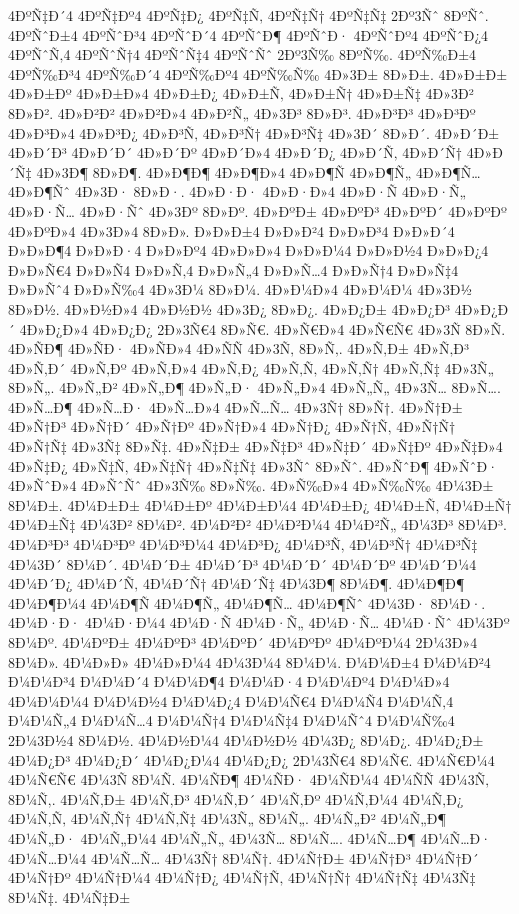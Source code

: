 {4ÐºÑ‡Ð´4
4ÐºÑ‡Ðº4
4ÐºÑ‡Ð¿
4ÐºÑ‡Ñ‚
4ÐºÑ‡Ñ†
4ÐºÑ‡Ñ‡
2Ðº3Ñˆ
8ÐºÑˆ.
4ÐºÑˆÐ±4
4ÐºÑˆÐ³4
4ÐºÑˆÐ´4
4ÐºÑˆÐ¶
4ÐºÑˆÐ·
4ÐºÑˆÐº4
4ÐºÑˆÐ¿4
4ÐºÑˆÑ‚4
4ÐºÑˆÑ†4
4ÐºÑˆÑ‡4
4ÐºÑˆÑˆ
2Ðº3Ñ‰
8ÐºÑ‰.
4ÐºÑ‰Ð±4
4ÐºÑ‰Ð³4
4ÐºÑ‰Ð´4
4ÐºÑ‰Ðº4
4ÐºÑ‰Ñ‰
4Ð»3Ð±
8Ð»Ð±.
4Ð»Ð±Ð±
4Ð»Ð±Ðº
4Ð»Ð±Ð»4
4Ð»Ð±Ð¿
4Ð»Ð±Ñ‚
4Ð»Ð±Ñ†
4Ð»Ð±Ñ‡
4Ð»3Ð²
8Ð»Ð².
4Ð»Ð²Ð²
4Ð»Ð²Ð»4
4Ð»Ð²Ñ„
4Ð»3Ð³
8Ð»Ð³.
4Ð»Ð³Ð³
4Ð»Ð³Ðº
4Ð»Ð³Ð»4
4Ð»Ð³Ð¿
4Ð»Ð³Ñ‚
4Ð»Ð³Ñ†
4Ð»Ð³Ñ‡
4Ð»3Ð´
8Ð»Ð´.
4Ð»Ð´Ð±
4Ð»Ð´Ð³
4Ð»Ð´Ð´
4Ð»Ð´Ðº
4Ð»Ð´Ð»4
4Ð»Ð´Ð¿
4Ð»Ð´Ñ‚
4Ð»Ð´Ñ†
4Ð»Ð´Ñ‡
4Ð»3Ð¶
8Ð»Ð¶.
4Ð»Ð¶Ð¶
4Ð»Ð¶Ð»4
4Ð»Ð¶Ñ
4Ð»Ð¶Ñ„
4Ð»Ð¶Ñ…
4Ð»Ð¶Ñˆ
4Ð»3Ð·
8Ð»Ð·.
4Ð»Ð·Ð·
4Ð»Ð·Ð»4
4Ð»Ð·Ñ
4Ð»Ð·Ñ„
4Ð»Ð·Ñ…
4Ð»Ð·Ñˆ
4Ð»3Ðº
8Ð»Ðº.
4Ð»ÐºÐ±
4Ð»ÐºÐ³
4Ð»ÐºÐ´
4Ð»ÐºÐº
4Ð»ÐºÐ»4
4Ð»3Ð»4
8Ð»Ð».
Ð»Ð»Ð±4
Ð»Ð»Ð²4
Ð»Ð»Ð³4
Ð»Ð»Ð´4
Ð»Ð»Ð¶4
Ð»Ð»Ð·4
Ð»Ð»Ðº4
4Ð»Ð»Ð»4
Ð»Ð»Ð¼4
Ð»Ð»Ð½4
Ð»Ð»Ð¿4
Ð»Ð»Ñ€4
Ð»Ð»Ñ4
Ð»Ð»Ñ‚4
Ð»Ð»Ñ„4
Ð»Ð»Ñ…4
Ð»Ð»Ñ†4
Ð»Ð»Ñ‡4
Ð»Ð»Ñˆ4
Ð»Ð»Ñ‰4
4Ð»3Ð¼
8Ð»Ð¼.
4Ð»Ð¼Ð»4
4Ð»Ð¼Ð¼
4Ð»3Ð½
8Ð»Ð½.
4Ð»Ð½Ð»4
4Ð»Ð½Ð½
4Ð»3Ð¿
8Ð»Ð¿.
4Ð»Ð¿Ð±
4Ð»Ð¿Ð³
4Ð»Ð¿Ð´
4Ð»Ð¿Ð»4
4Ð»Ð¿Ð¿
2Ð»3Ñ€4
8Ð»Ñ€.
4Ð»Ñ€Ð»4
4Ð»Ñ€Ñ€
4Ð»3Ñ
8Ð»Ñ.
4Ð»ÑÐ¶
4Ð»ÑÐ·
4Ð»ÑÐ»4
4Ð»ÑÑ
4Ð»3Ñ‚
8Ð»Ñ‚.
4Ð»Ñ‚Ð±
4Ð»Ñ‚Ð³
4Ð»Ñ‚Ð´
4Ð»Ñ‚Ðº
4Ð»Ñ‚Ð»4
4Ð»Ñ‚Ð¿
4Ð»Ñ‚Ñ‚
4Ð»Ñ‚Ñ†
4Ð»Ñ‚Ñ‡
4Ð»3Ñ„
8Ð»Ñ„.
4Ð»Ñ„Ð²
4Ð»Ñ„Ð¶
4Ð»Ñ„Ð·
4Ð»Ñ„Ð»4
4Ð»Ñ„Ñ„
4Ð»3Ñ…
8Ð»Ñ….
4Ð»Ñ…Ð¶
4Ð»Ñ…Ð·
4Ð»Ñ…Ð»4
4Ð»Ñ…Ñ…
4Ð»3Ñ†
8Ð»Ñ†.
4Ð»Ñ†Ð±
4Ð»Ñ†Ð³
4Ð»Ñ†Ð´
4Ð»Ñ†Ðº
4Ð»Ñ†Ð»4
4Ð»Ñ†Ð¿
4Ð»Ñ†Ñ‚
4Ð»Ñ†Ñ†
4Ð»Ñ†Ñ‡
4Ð»3Ñ‡
8Ð»Ñ‡.
4Ð»Ñ‡Ð±
4Ð»Ñ‡Ð³
4Ð»Ñ‡Ð´
4Ð»Ñ‡Ðº
4Ð»Ñ‡Ð»4
4Ð»Ñ‡Ð¿
4Ð»Ñ‡Ñ‚
4Ð»Ñ‡Ñ†
4Ð»Ñ‡Ñ‡
4Ð»3Ñˆ
8Ð»Ñˆ.
4Ð»ÑˆÐ¶
4Ð»ÑˆÐ·
4Ð»ÑˆÐ»4
4Ð»ÑˆÑˆ
4Ð»3Ñ‰
8Ð»Ñ‰.
4Ð»Ñ‰Ð»4
4Ð»Ñ‰Ñ‰
4Ð¼3Ð±
8Ð¼Ð±.
4Ð¼Ð±Ð±
4Ð¼Ð±Ðº
4Ð¼Ð±Ð¼4
4Ð¼Ð±Ð¿
4Ð¼Ð±Ñ‚
4Ð¼Ð±Ñ†
4Ð¼Ð±Ñ‡
4Ð¼3Ð²
8Ð¼Ð².
4Ð¼Ð²Ð²
4Ð¼Ð²Ð¼4
4Ð¼Ð²Ñ„
4Ð¼3Ð³
8Ð¼Ð³.
4Ð¼Ð³Ð³
4Ð¼Ð³Ðº
4Ð¼Ð³Ð¼4
4Ð¼Ð³Ð¿
4Ð¼Ð³Ñ‚
4Ð¼Ð³Ñ†
4Ð¼Ð³Ñ‡
4Ð¼3Ð´
8Ð¼Ð´.
4Ð¼Ð´Ð±
4Ð¼Ð´Ð³
4Ð¼Ð´Ð´
4Ð¼Ð´Ðº
4Ð¼Ð´Ð¼4
4Ð¼Ð´Ð¿
4Ð¼Ð´Ñ‚
4Ð¼Ð´Ñ†
4Ð¼Ð´Ñ‡
4Ð¼3Ð¶
8Ð¼Ð¶.
4Ð¼Ð¶Ð¶
4Ð¼Ð¶Ð¼4
4Ð¼Ð¶Ñ
4Ð¼Ð¶Ñ„
4Ð¼Ð¶Ñ…
4Ð¼Ð¶Ñˆ
4Ð¼3Ð·
8Ð¼Ð·.
4Ð¼Ð·Ð·
4Ð¼Ð·Ð¼4
4Ð¼Ð·Ñ
4Ð¼Ð·Ñ„
4Ð¼Ð·Ñ…
4Ð¼Ð·Ñˆ
4Ð¼3Ðº
8Ð¼Ðº.
4Ð¼ÐºÐ±
4Ð¼ÐºÐ³
4Ð¼ÐºÐ´
4Ð¼ÐºÐº
4Ð¼ÐºÐ¼4
2Ð¼3Ð»4
8Ð¼Ð».
4Ð¼Ð»Ð»
4Ð¼Ð»Ð¼4
4Ð¼3Ð¼4
8Ð¼Ð¼.
Ð¼Ð¼Ð±4
Ð¼Ð¼Ð²4
Ð¼Ð¼Ð³4
Ð¼Ð¼Ð´4
Ð¼Ð¼Ð¶4
Ð¼Ð¼Ð·4
Ð¼Ð¼Ðº4
Ð¼Ð¼Ð»4
4Ð¼Ð¼Ð¼4
Ð¼Ð¼Ð½4
Ð¼Ð¼Ð¿4
Ð¼Ð¼Ñ€4
Ð¼Ð¼Ñ4
Ð¼Ð¼Ñ‚4
Ð¼Ð¼Ñ„4
Ð¼Ð¼Ñ…4
Ð¼Ð¼Ñ†4
Ð¼Ð¼Ñ‡4
Ð¼Ð¼Ñˆ4
Ð¼Ð¼Ñ‰4
2Ð¼3Ð½4
8Ð¼Ð½.
4Ð¼Ð½Ð¼4
4Ð¼Ð½Ð½
4Ð¼3Ð¿
8Ð¼Ð¿.
4Ð¼Ð¿Ð±
4Ð¼Ð¿Ð³
4Ð¼Ð¿Ð´
4Ð¼Ð¿Ð¼4
4Ð¼Ð¿Ð¿
2Ð¼3Ñ€4
8Ð¼Ñ€.
4Ð¼Ñ€Ð¼4
4Ð¼Ñ€Ñ€
4Ð¼3Ñ
8Ð¼Ñ.
4Ð¼ÑÐ¶
4Ð¼ÑÐ·
4Ð¼ÑÐ¼4
4Ð¼ÑÑ
4Ð¼3Ñ‚
8Ð¼Ñ‚.
4Ð¼Ñ‚Ð±
4Ð¼Ñ‚Ð³
4Ð¼Ñ‚Ð´
4Ð¼Ñ‚Ðº
4Ð¼Ñ‚Ð¼4
4Ð¼Ñ‚Ð¿
4Ð¼Ñ‚Ñ‚
4Ð¼Ñ‚Ñ†
4Ð¼Ñ‚Ñ‡
4Ð¼3Ñ„
8Ð¼Ñ„.
4Ð¼Ñ„Ð²
4Ð¼Ñ„Ð¶
4Ð¼Ñ„Ð·
4Ð¼Ñ„Ð¼4
4Ð¼Ñ„Ñ„
4Ð¼3Ñ…
8Ð¼Ñ….
4Ð¼Ñ…Ð¶
4Ð¼Ñ…Ð·
4Ð¼Ñ…Ð¼4
4Ð¼Ñ…Ñ…
4Ð¼3Ñ†
8Ð¼Ñ†.
4Ð¼Ñ†Ð±
4Ð¼Ñ†Ð³
4Ð¼Ñ†Ð´
4Ð¼Ñ†Ðº
4Ð¼Ñ†Ð¼4
4Ð¼Ñ†Ð¿
4Ð¼Ñ†Ñ‚
4Ð¼Ñ†Ñ†
4Ð¼Ñ†Ñ‡
4Ð¼3Ñ‡
8Ð¼Ñ‡.
4Ð¼Ñ‡Ð±
}
